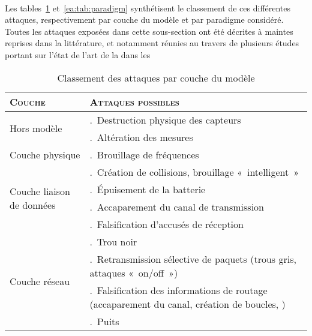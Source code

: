         \paragraph{}
Les tables~\ref{ea:tab:layer} et~\ref{ea:tab:paradigm} synthétisent le classement de ces différentes attaques, respectivement par couche du modèle \tcpip et par paradigme considéré.
Toutes les attaques exposées dans cette sous-section ont été décrites à maintes reprises dans la littérature, et notamment réunies au travers de plusieurs études portant sur l'état de l'art de la \secu dans les \rcs~\cite{SSS11,RM11,AD14}
\begin{table}[!ht]
    \setcounter{LayerNumber}{1}
    \newcommand\num[1]{\theLayerNumber.~#1\stepcounter{LayerNumber}}
    \caption{Classement des attaques par couche du modèle \tcpip}\label{ea:tab:layer}
    \centering
    \medskip
    \begin{small}
        \begin{tabular}{m{}|p{}}
            \toprule
            \textsc{Couche} & \textsc{Attaques possibles}\\
            \midrule
            \multirow{2}{*}{Hors modèle}%
                & \num{Destruction physique des capteurs}\\
                & \num{Altération des mesures}\\
            \midrule
            \multirow{1}{*}{Couche physique}%
                & \num{Brouillage de fréquences}\\
            \midrule
            \multirow{4}{*}{\parbox{.2\textwidth}{Couche liaison de données}}%
                & \num{Création de collisions, brouillage « intelligent »}\\
                & \num{Épuisement de la batterie}\\
                & \num{Accaparement du canal de transmission}\\
                & \num{Falsification d'accusés de réception}\\
            \midrule
            \multirow{8}{*}{Couche réseau}%
                & \num{Trou noir}\\
                & \num{Retransmission sélective de paquets (trous gris, attaques « on/off »)}\\
                & \num{Falsification des informations de routage (accaparement du canal, création de boucles, \etc)}\\
                & \num{Puits}\\

\end{tabular}
\end{small}
\end{table}

